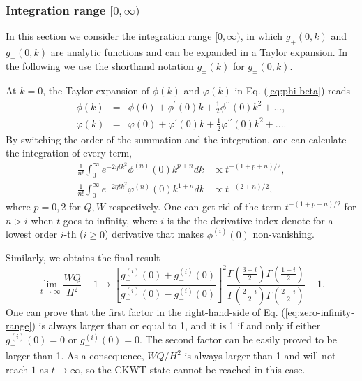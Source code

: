 \documentclass[english,aps,superscriptaddress,preprint]{revtex4-1}
\begin{document}
\subsubsection{Integration range $[0,\infty)$}

In this section we consider the integration range $[0,\infty)$, in
which $g_{+}(0,k)$ and $g_{-}(0,k)$ are analytic functions and can
be expanded in a Taylor expansion. In the following we use the shorthand
notation $g_{\pm}(k)$ for $g_{\pm}(0,k)$.

At $k=0$, the Taylor expansion of $\phi(k)$ and $\varphi(k)$ in
Eq. (\ref{eq:phi-beta}) reads 
\begin{eqnarray}
\phi(k) & = & \phi(0)+\phi^{\prime}(0)k+\frac{1}{2}\phi^{\prime\prime}(0)k^{2}+...,\nonumber \\
\varphi(k) & = & \varphi(0)+\varphi^{\prime}(0)k+\frac{1}{2}\varphi^{\prime\prime}(0)k^{2}+....
\end{eqnarray}
By switching the order of the summation and the integration, one can
calculate the integration of every term, 
\begin{align}
\frac{1}{n!}\int_{0}^{\infty}e^{-2\eta tk^{2}}\phi^{(n)}(0)k^{p+n}dk & \propto t^{-(1+p+n)/2},\nonumber \\
\frac{1}{n!}\int_{0}^{\infty}e^{-2\eta tk^{2}}\varphi^{(n)}(0)k^{1+n}dk & \propto t^{-(2+n)/2},
\end{align}
where $p=0,2$ for $Q,W$ respectively. One can get rid of the term
$t^{-(1+p+n)/2}$ for $n>i$ when $t$ goes to infinity, where $i$
is the the derivative index denote for a lowest order $i$-th ($i\geq0$)
derivative that makes $\phi^{(i)}(0)$ non-vanishing.

Similarly, we obtains the final result 
\begin{equation}
\lim_{t\rightarrow\infty}\frac{WQ}{H^{2}}-1\rightarrow\left[\frac{g_{+}^{(i)}(0)+g_{-}^{(i)}(0)}{g_{+}^{(i)}(0)-g_{-}^{(i)}(0)}\right]^{2}\frac{\Gamma\left(\frac{3+i}{2}\right)\Gamma\left(\frac{1+i}{2}\right)}{\Gamma\left(\frac{2+i}{2}\right)\Gamma\left(\frac{2+i}{2}\right)}-1.\label{eq:zero-infinity-range}
\end{equation}
One can prove that the first factor in the right-hand-side of Eq.
(\ref{eq:zero-infinity-range}) is always larger than or equal to
1, and it is 1 if and only if either $g_{+}^{(i)}(0)=0$ or $g_{-}^{(i)}(0)=0$.
The second factor can be easily proved to be larger than 1. As a consequence,
$WQ/H^{2}$ is always larger than 1 and will not reach $1$ as $t\rightarrow\infty$,
so the CKWT state cannot be reached in this case.
\end{document}
